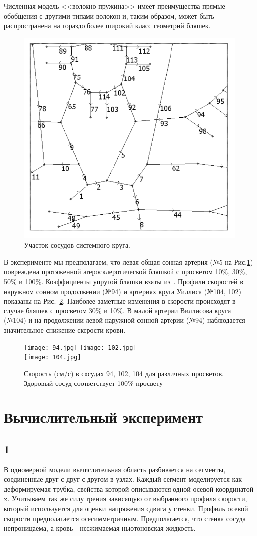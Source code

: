 Численная модель <<волокно-пружина>> имеет преимущества прямые обобщения с другими типами волокон и, таким образом, 
может быть распространена на гораздо более широкий класс геометрий бляшек.

\begin{figure}[h]
\centering
\includegraphics[width=0.4\linewidth]{chast.png}
\caption{Участок сосудов системного круга.}
\label{ych}
\end{figure}

В эксперименте мы предполагаем, что левая общая сонная артерия (№5 на Рис.\ref{ych}) повреждена протяженной атеросклеротической бляшкой 
с просветом 10\%, 30\%, 50\% и 100\%. Коэффициенты упругой бляшки взяты из~\cite{vassilevski:2011}. 
Профили скоростей в наружном сонном продолжении (№94) и артериях круга Уиллиса (№104, 102) показаны на Рис.~\ref{sc}. 
Наиболее заметные изменения в скорости происходят в случае бляшек с просветом 30\% и 10\%. 
В малой артерии Виллисова круга (№104) и на продолжении левой наружной сонной артерии (№94) наблюдается значительное снижение скорости крови.

\begin{figure}[h]
\centering
\texttt{[image: 94.jpg]}
\texttt{[image: 102.jpg]}\\
\texttt{[image: 104.jpg]}
\caption{Скорость (см/с) в сосудах 94, 102, 104 для различных просветов. Здоровый сосуд
соответствует 100\% просвету}
\label{sc}
\end{figure}


\section{Вычислительный эксперимент}
\subsection*{1}

В одномерной модели вычислительная область разбивается на сегменты, соединенные друг с друг с другом в узлах. 
Каждый сегмент моделируется как деформируемая трубка, свойства которой описываются одной осевой координатой x. 
Учитываем так же силу трения зависящую от выбранного профиля скорости, который используется для оценки напряжения сдвига у стенки. 
Профиль осевой скорости предполагается осесимметричным.
Предполагается, что стенка сосуда непроницаема, а кровь - несжимаемая ньютоновская жидкость.

